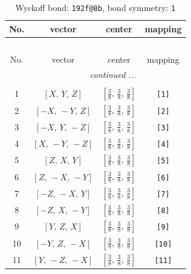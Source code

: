 \documentclass[fleqn,8pt]{jsarticle}
\begin{document}
\begin{longtable}{cccc}
\caption{Wyckoff bond: {\tt 192f@8b}, bond symmetry: {\tt 1}}
 \\
 \hline \hline
No. & vector & center & mapping \\ \hline \endfirsthead

\multicolumn{3}{l}{\tablename\ \thetable{}} \\
 \hline \hline
No. & vector & center & mapping \\ \hline \endhead

 \hline \hline
\multicolumn{3}{r}{\footnotesize\it continued ...} \\ \endfoot

 \hline \hline
\multicolumn{3}{r}{} \\ \endlastfoot

1 & $\left[ X,\, Y,\, Z \right]$ & $\left[ \frac{3}{8},\, \frac{3}{8},\, \frac{3}{8} \right]$ & {\tt [1]} \\ \hline
2 & $\left[ - X,\, - Y,\, Z \right]$ & $\left[ \frac{3}{8},\, \frac{3}{8},\, \frac{3}{8} \right]$ & {\tt [2]} \\ \hline
3 & $\left[ - X,\, Y,\, - Z \right]$ & $\left[ \frac{3}{8},\, \frac{3}{8},\, \frac{3}{8} \right]$ & {\tt [3]} \\ \hline
4 & $\left[ X,\, - Y,\, - Z \right]$ & $\left[ \frac{3}{8},\, \frac{3}{8},\, \frac{3}{8} \right]$ & {\tt [4]} \\ \hline
5 & $\left[ Z,\, X,\, Y \right]$ & $\left[ \frac{3}{8},\, \frac{3}{8},\, \frac{3}{8} \right]$ & {\tt [5]} \\ \hline
6 & $\left[ Z,\, - X,\, - Y \right]$ & $\left[ \frac{3}{8},\, \frac{3}{8},\, \frac{3}{8} \right]$ & {\tt [6]} \\ \hline
7 & $\left[ - Z,\, - X,\, Y \right]$ & $\left[ \frac{3}{8},\, \frac{3}{8},\, \frac{3}{8} \right]$ & {\tt [7]} \\ \hline
8 & $\left[ - Z,\, X,\, - Y \right]$ & $\left[ \frac{3}{8},\, \frac{3}{8},\, \frac{3}{8} \right]$ & {\tt [8]} \\ \hline
9 & $\left[ Y,\, Z,\, X \right]$ & $\left[ \frac{3}{8},\, \frac{3}{8},\, \frac{3}{8} \right]$ & {\tt [9]} \\ \hline
10 & $\left[ - Y,\, Z,\, - X \right]$ & $\left[ \frac{3}{8},\, \frac{3}{8},\, \frac{3}{8} \right]$ & {\tt [10]} \\ \hline
11 & $\left[ Y,\, - Z,\, - X \right]$ & $\left[ \frac{3}{8},\, \frac{3}{8},\, \frac{3}{8} \right]$ & {\tt [11]} \\ \hline

\end{longtable}
\end{document}
